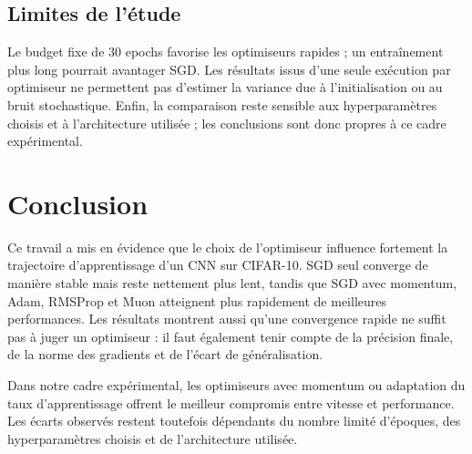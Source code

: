 \documentclass[12pt]{article}
\begin{document}
\subsection{Limites de l'étude}

Le budget fixe de 30 epochs favorise les optimiseurs rapides ; un entraînement
plus long pourrait avantager SGD. Les résultats issus d'une seule exécution par
optimiseur ne permettent pas d'estimer la variance due à l'initialisation ou au
bruit stochastique. Enfin, la comparaison reste sensible aux hyperparamètres
choisis et à l'architecture utilisée ; les conclusions sont donc propres à ce
cadre expérimental.

\section{Conclusion}
\label{sec:conclusion}

Ce travail a mis en évidence que le choix de l'optimiseur influence fortement la
trajectoire d'apprentissage d'un CNN sur CIFAR-10. SGD seul converge de manière
stable mais reste nettement plus lent, tandis que SGD avec momentum, Adam,
RMSProp et Muon atteignent plus rapidement de meilleures performances. Les
résultats montrent aussi qu'une convergence rapide ne suffit pas à juger un
optimiseur : il faut également tenir compte de la précision finale, de la norme
des gradients et de l'écart de généralisation.

Dans notre cadre expérimental, les optimiseurs avec momentum ou adaptation du
taux d'apprentissage offrent le meilleur compromis entre vitesse et performance.
Les écarts observés restent toutefois dépendants du nombre limité d'époques, des
hyperparamètres choisis et de l'architecture utilisée.
\end{document}
